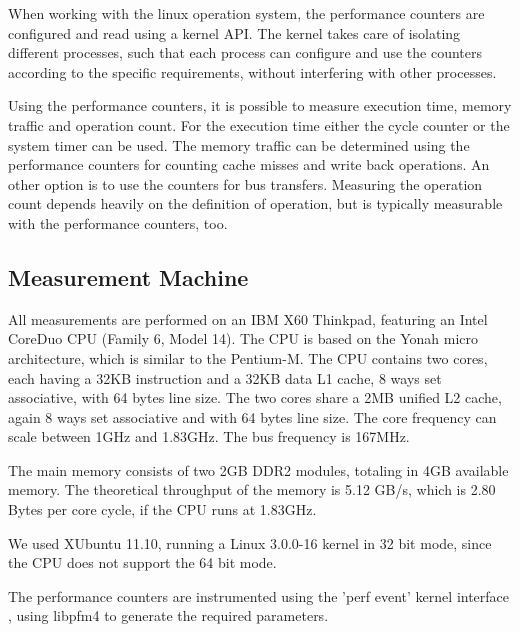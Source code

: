 \documentclass[a4paper,12pt]{article}
\begin{document}
When working with the linux operation system, the performance counters are
configured and read using a kernel API. The kernel takes care of isolating
different processes, such that each process can configure and use the counters
according to the specific requirements, without interfering with other processes.

Using the performance counters, it is possible to measure execution time, memory
traffic and operation count. For the execution time either the cycle counter or
the system timer can be used. The memory traffic can be determined using the
performance counters for counting cache misses and write back operations. An
other option is to use the counters for bus transfers. Measuring the operation count
depends heavily on the definition of operation, but is typically measurable with
the performance counters, too.

\subsection{Measurement Machine}
All measurements are performed on an IBM X60 Thinkpad, featuring an Intel
CoreDuo CPU (Family 6, Model 14). The CPU is based on the Yonah
micro architecture, which is similar to the Pentium-M. The CPU contains two
cores, each having a 32KB instruction and a 32KB data L1 cache, 8 ways set associative,
with 64 bytes line size. The two cores share a 2MB unified L2 cache, again 8
ways set associative and with 64 bytes line size. The core frequency can scale
between 1GHz and 1.83GHz. The bus frequency is 167MHz. 

The main memory consists of two 2GB DDR2 modules, totaling in 4GB available
memory. The theoretical throughput of the memory is 5.12 GB/s, which is 2.80
Bytes per core cycle, if the CPU runs at 1.83GHz.

We used XUbuntu 11.10, running a Linux 3.0.0-16 kernel in 32 bit mode, since
the CPU does not support the 64 bit mode.

The performance counters are instrumented using the 'perf event' kernel
interface \cite{unoffPerfEventsWebPage}, using libpfm4  \cite{libpfm4Docu} to
generate the required parameters.
\end{document}
